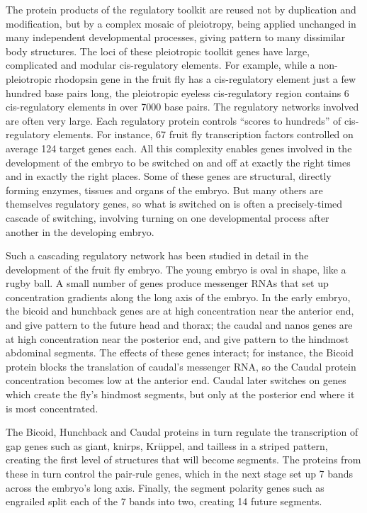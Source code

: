 The protein products of the regulatory toolkit are reused not by duplication and modification, but by a complex mosaic of pleiotropy, being applied unchanged in many independent developmental processes, giving pattern to many dissimilar body structures. The loci of these pleiotropic toolkit genes have large, complicated and modular cis-regulatory elements. For example, while a non-pleiotropic rhodopsin gene in the fruit fly has a cis-regulatory element just a few hundred base pairs long, the pleiotropic eyeless cis-regulatory region contains 6 cis-regulatory elements in over 7000 base pairs. The regulatory networks involved are often very large. Each regulatory protein controls ``scores to hundreds'' of cis-regulatory elements. For instance, 67 fruit fly transcription factors controlled on average 124 target genes each. All this complexity enables genes involved in the development of the embryo to be switched on and off at exactly the right times and in exactly the right places. Some of these genes are structural, directly forming enzymes, tissues and organs of the embryo. But many others are themselves regulatory genes, so what is switched on is often a precisely-timed cascade of switching, involving turning on one developmental process after another in the developing embryo.

Such a cascading regulatory network has been studied in detail in the development of the fruit fly embryo. The young embryo is oval in shape, like a rugby ball. A small number of genes produce messenger RNAs that set up concentration gradients along the long axis of the embryo. In the early embryo, the bicoid and hunchback genes are at high concentration near the anterior end, and give pattern to the future head and thorax; the caudal and nanos genes are at high concentration near the posterior end, and give pattern to the hindmost abdominal segments. The effects of these genes interact; for instance, the Bicoid protein blocks the translation of caudal's messenger RNA, so the Caudal protein concentration becomes low at the anterior end. Caudal later switches on genes which create the fly's hindmost segments, but only at the posterior end where it is most concentrated.

The Bicoid, Hunchback and Caudal proteins in turn regulate the transcription of gap genes such as giant, knirps, Krüppel, and tailless in a striped pattern, creating the first level of structures that will become segments. The proteins from these in turn control the pair-rule genes, which in the next stage set up 7 bands across the embryo's long axis. Finally, the segment polarity genes such as engrailed split each of the 7 bands into two, creating 14 future segments.

